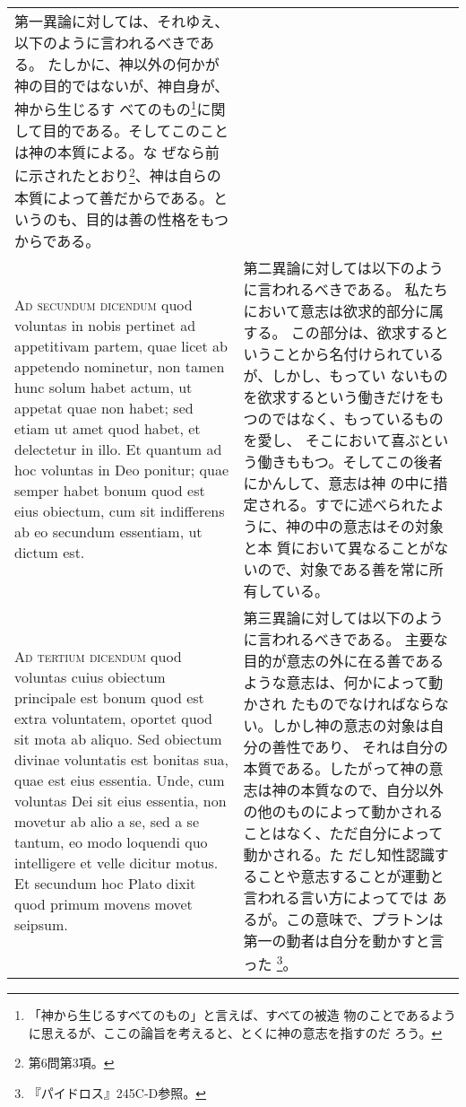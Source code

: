 \documentclass[10pt]{jsarticle} %
\begin{document}
\begin{longtable}{p{21em}p{21em}}
 第一異論に対しては、それゆえ、以下のように言われるべきである。
たしかに、神以外の何かが神の目的ではないが、神自身が、神から生じるす
 べてのもの\footnote{「神から生じるすべてのもの」と言えば、すべての被造
 物のことであるように思えるが、ここの論旨を考えると、とくに神の意志を指すのだ
 ろう。}に関して目的である。そしてこのことは神の本質による。な
 ぜなら前に示されたとおり\footnote{第6問第3項。}、神は自らの本質によって善だからである。と
 いうのも、目的は善の性格をもつからである。

 
\\


{\scshape Ad secundum dicendum} quod voluntas in nobis
pertinet ad appetitivam partem, quae licet ab appetendo nominetur, non
tamen hunc solum habet actum, ut appetat quae non habet; sed etiam ut
amet quod habet, et delectetur in illo. Et quantum ad hoc voluntas in
Deo ponitur; quae semper habet bonum quod est eius obiectum, cum sit
indifferens ab eo secundum essentiam, ut dictum est.

&

 第二異論に対しては以下のように言われるべきである。
 私たちにおいて意志は欲求的部分に属する。
 この部分は、欲求するということから名付けられているが、しかし、もってい
 ないものを欲求するという働きだけをもつのではなく、もっているものを愛し、
 そこにおいて喜ぶという働きももつ。そしてこの後者にかんして、意志は神
 の中に措定される。すでに述べられたように、神の中の意志はその対象と本
 質において異なることがないので、対象である善を常に所有している。

\\


{\scshape Ad tertium dicendum} quod voluntas cuius
obiectum principale est bonum quod est extra voluntatem, oportet quod
sit mota ab aliquo. Sed obiectum divinae voluntatis est bonitas sua,
quae est eius essentia. Unde, cum voluntas Dei sit eius essentia, non
movetur ab alio a se, sed a se tantum, eo modo loquendi quo intelligere
et velle dicitur motus. Et secundum hoc Plato dixit quod primum movens
movet seipsum.

&

 第三異論に対しては以下のように言われるべきである。
 主要な目的が意志の外に在る善であるような意志は、何かによって動かされ
 たものでなければならない。しかし神の意志の対象は自分の善性であり、
 それは自分の本質である。したがって神の意志は神の本質なので、自分以外
 の他のものによって動かされることはなく、ただ自分によって動かされる。た
 だし知性認識することや意志することが運動と言われる言い方によってでは
 あるが。この意味で、プラトンは第一の動者は自分を動かすと言った
 \footnote{『パイドロス』245C-D参照。}。


\end{longtable}
\end{document}

